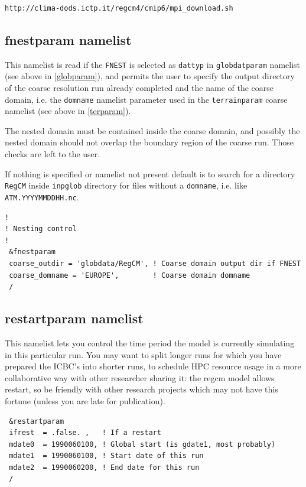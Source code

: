 \begin{Verbatim}
http://clima-dods.ictp.it/regcm4/cmip6/mpi_download.sh
\end{Verbatim}

\subsection{fnestparam namelist}

This namelist is read if the \verb=FNEST= is selected as \verb=dattyp= in
\verb=globdatparam= namelist (see above in \ref{globparam}), and permits
the user to specify the output directory of the coarse resolution run
already completed and the name of the coarse domain, i.e. the \verb=domname=
namelist parameter used in the \verb=terrainparam= coarse namelist
(see above in \ref{terparam}).

The nested domain must be contained inside the coarse domain, and possibly
the nested domain should not overlap the boundary region of the coarse run.
Those checks are left to the user.

If nothing is specified or namelist not present default is to search for
a directory \verb=RegCM= inside \verb=inpglob= directory for files without
a \verb=domname=, i.e. like \verb=ATM.YYYYMMDDHH.nc=.

{\footnotesize
\begin{Verbatim}
!
! Nesting control
!
 &fnestparam
 coarse_outdir = 'globdata/RegCM', ! Coarse domain output dir if FNEST
 coarse_domname = 'EUROPE',        ! Coarse domain domname
 /
\end{Verbatim}
}

\subsection{restartparam namelist}

This namelist lets you control the time period the model is currently simulating
in this particular run. You may want to split longer runs for which you have
prepared the ICBC's into shorter runs, to schedule HPC resource usage in a more
collaborative way with other researcher sharing it: the regcm model allows
restart, so be friendly with other research projects which may not have this
fortune (unless you are late for publication).

{\footnotesize
\begin{Verbatim}
 &restartparam
 ifrest  = .false. ,   ! If a restart
 mdate0  = 1990060100, ! Global start (is gdate1, most probably)
 mdate1  = 1990060100, ! Start date of this run
 mdate2  = 1990060200, ! End date for this run
 /
\end{Verbatim}
}

